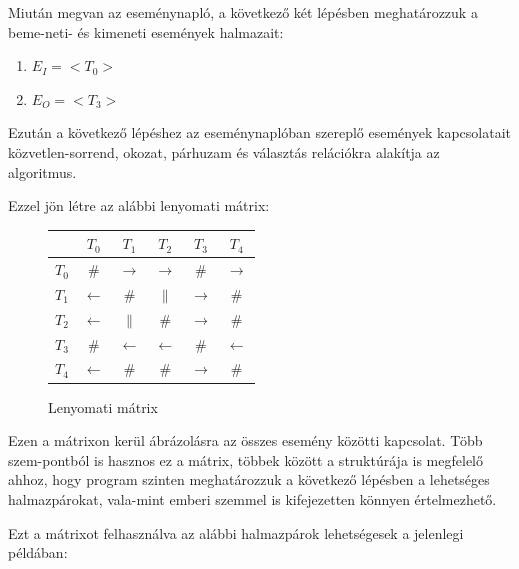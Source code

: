 \begin{example}
	Miután megvan az eseménynapló, a következő két lépésben meghatározzuk a beme\hyp{}neti- és kimeneti események halmazait:
	\begin{enumerate}
		\item $E_I=<T_0>$
		\item $E_O=<T_3>$		
	\end{enumerate}

	Ezután a következő lépéshez az eseménynaplóban szereplő események kapcsolatait közvetlen-sorrend, okozat, párhuzam és választás relációkra alakítja az algoritmus.

	Ezzel jön létre az alábbi lenyomati mátrix:
	
	\begin{figure}[h]
	\begin{center}
	\caption{Lenyomati mátrix}
	\begin{tabular}{|c | c | c | c | c | c|}
		\hline
		\hspace{0.1cm} & $T_0$ & $T_1$ & $T_2$ & $T_3$ & $T_4$ \\
		\hline
		$T_0$ & \# & $\rightarrow$ & $\rightarrow$ & \# & $\rightarrow$ \\
		\hline
		$T_1$ & $\leftarrow$ & \# & $\parallel$ & $\rightarrow$ & \# \\
		\hline
		$T_2$ & $\leftarrow$ & $\parallel$ & \# & $\rightarrow$ & \# \\
		\hline
		$T_3$ & \# & $\leftarrow$ & $\leftarrow$ & \# & $\leftarrow$ \\
		\hline
		$T_4$ & $\leftarrow$ & \# & \# & $\rightarrow$ & \# \\
		\hline
	\end{tabular}
	\label{fig:planexample}
	\end{center}
	\end{figure}

	Ezen a mátrixon kerül ábrázolásra az összes esemény közötti kapcsolat. Több szem\hyp{}pontból is hasznos ez a mátrix, többek között a struktúrája is megfelelő ahhoz, hogy program szinten meghatározzuk a következő lépésben a lehetséges halmazpárokat, vala\hyp{}mint emberi szemmel is kifejezetten könnyen értelmezhető.

	Ezt a mátrixot felhasználva az alábbi halmazpárok lehetségesek a jelenlegi példában:
	\newpage


\end{example}
